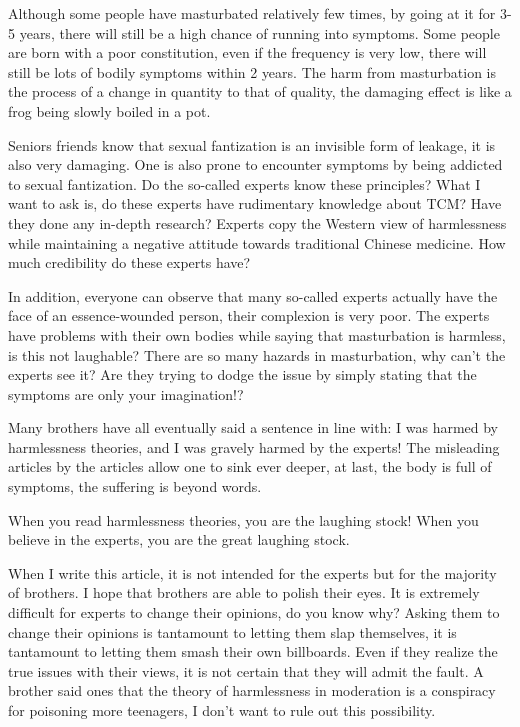 \documentclass[
]{book}
\begin{document}
Although some people have masturbated relatively few times, by going at it for 3-5 years, there will still be a high chance of running into symptoms. Some people are born with a poor constitution, even if the frequency is very low, there will still be lots of bodily symptoms within 2 years. The harm from masturbation is the process of a change in quantity to that of quality, the damaging effect is like a frog being slowly boiled in a pot.

Seniors friends know that sexual fantization is an invisible form of leakage, it is also very damaging. One is also prone to encounter symptoms by being addicted to sexual fantization. Do the so-called experts know these principles? What I want to ask is, do these experts have rudimentary knowledge about TCM? Have they done any in-depth research? Experts copy the Western view of harmlessness while maintaining a negative attitude towards traditional Chinese medicine. How much credibility do these experts have?

In addition, everyone can observe that many so-called experts actually have the face of an essence-wounded person, their complexion is very poor. The experts have problems with their own bodies while saying that masturbation is harmless, is this not laughable? There are so many hazards in masturbation, why can't the experts see it? Are they trying to dodge the issue by simply stating that the symptoms are only your imagination!?

Many brothers have all eventually said a sentence in line with: I was harmed by harmlessness theories, and I was gravely harmed by the experts! The misleading articles by the articles allow one to sink ever deeper, at last, the body is full of symptoms, the suffering is beyond words.

When you read harmlessness theories, you are the laughing stock! When you believe in the experts, you are the great laughing stock.

When I write this article, it is not intended for the experts but for the majority of brothers. I hope that brothers are able to polish their eyes. It is extremely difficult for experts to change their opinions, do you know why? Asking them to change their opinions is tantamount to letting them slap themselves, it is tantamount to letting them smash their own billboards. Even if they realize the true issues with their views, it is not certain that they will admit the fault. A brother said ones that the theory of harmlessness in moderation is a conspiracy for poisoning more teenagers, I don't want to rule out this possibility.
\end{document}
